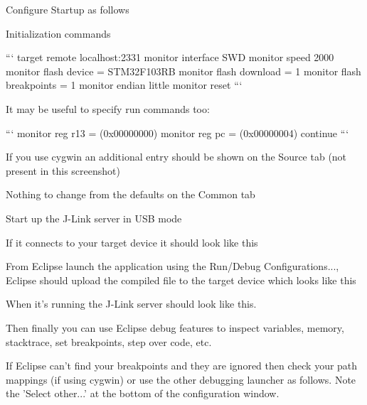Configure Startup as follows

Initialization commands

``` target remote localhost\+:2331 monitor interface S\+W\+D monitor speed 2000 monitor flash device = S\+T\+M32\+F103\+R\+B monitor flash download = 1 monitor flash breakpoints = 1 monitor endian little monitor reset ```





It may be useful to specify run commands too\+:

``` monitor reg r13 = (0x00000000) monitor reg pc = (0x00000004) continue ```



If you use cygwin an additional entry should be shown on the Source tab (not present in this screenshot)



Nothing to change from the defaults on the Common tab



Start up the J-\/\+Link server in U\+S\+B mode



If it connects to your target device it should look like this



From Eclipse launch the application using the Run/\+Debug Configurations..., Eclipse should upload the compiled file to the target device which looks like this



When it's running the J-\/\+Link server should look like this.



Then finally you can use Eclipse debug features to inspect variables, memory, stacktrace, set breakpoints, step over code, etc.



If Eclipse can't find your breakpoints and they are ignored then check your path mappings (if using cygwin) or use the other debugging launcher as follows. Note the 'Select other...' at the bottom of the configuration window.

 